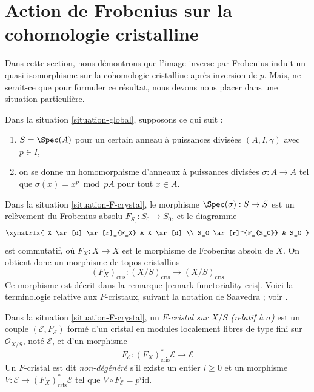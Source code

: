 \section{Action de Frobenius sur la cohomologie cristalline}
\label{section-frobenius}

\noindent
Dans cette section, nous démontrons que l'image inverse par Frobenius induit un quasi-isomorphisme
sur la cohomologie cristalline après inversion de $p$. Mais, ne serait-ce que
pour formuler ce résultat, nous devons nous placer dans une situation particulière.

\begin{situation}
\label{situation-F-crystal}
Dans la situation \ref{situation-global}, supposons ce qui suit :
\begin{enumerate}
\item $S = \Spec(A)$ pour un certain anneau à puissances divisées $(A, I, \gamma)$
avec $p \in I$,
\item on se donne un homomorphisme d'anneaux à puissances divisées $\sigma : A \to A$
tel que $\sigma(x) = x^p \bmod pA$ pour tout $x \in A$.
\end{enumerate}
\end{situation}

\noindent
Dans la situation \ref{situation-F-crystal}, le morphisme
$\Spec(\sigma) : S \to S$ est un relèvement du Frobenius absolu
$F_{S_0} : S_0 \to S_0$, et le diagramme
$$
\xymatrix{
X \ar[d] \ar[r]_{F_X} & X \ar[d] \\
S_0 \ar[r]^{F_{S_0}} & S_0
}
$$
est commutatif, où $F_X : X \to X$ est le morphisme de Frobenius absolu
de $X$. On obtient donc un morphisme de topos cristallins
$$
(F_X)_{\text{cris}} :
(X/S)_{\text{cris}}
\longrightarrow
(X/S)_{\text{cris}}
$$
Ce morphisme est décrit dans la remarque \ref{remark-functoriality-cris}. Voici la terminologie relative aux
$F$-cristaux, suivant la notation de Saavedra ; voir
\cite{Saavedra}.

\begin{definition}
\label{definition-F-crystal}
Dans la situation \ref{situation-F-crystal}, un {\it $F$-cristal sur $X/S$
(relatif à $\sigma$)} est un couple $(\mathcal{E}, F_\mathcal{E})$
formé d'un cristal en modules localement libres de type fini sur $\mathcal{O}_{X/S}$,
noté $\mathcal{E}$, et d'un morphisme
$$
F_\mathcal{E} : (F_X)_{\text{cris}}^*\mathcal{E} \longrightarrow \mathcal{E}
$$
Un $F$-cristal est dit {\it non-dégénéré} s'il existe un entier
$i \geq 0$ et un morphisme $V : \mathcal{E} \to (F_X)_{\text{cris}}^*\mathcal{E}$
tel que $V \circ F_{\mathcal{E}} = p^i \text{id}$.
\end{definition}

